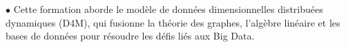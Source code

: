 \documentclass[theme]{cv_einstein}
\begin{document}
\begin{paracol}{2}
\begin{leftcolumn}
{}
        \end{leftcolumn}
        \begin{rightcolumn}\noindent  
            \hspace{-2.4pt}
            {  $\bullet$ Cette formation aborde le modèle de données dimensionnelles distribuées dynamiques (D4M), qui fusionne la théorie des graphes, l'algèbre linéaire et les bases de données pour résoudre les défis liés aux Big Data.}
             
          
            \end{rightcolumn}
            \begin{rightcolumn}\noindent \small
        \end{rightcolumn}
        \vspace{0em}
    \end{paracol}
\end{document}
